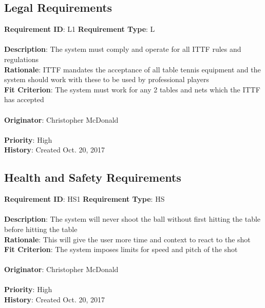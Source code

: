 \documentclass[11pt]{article}
\begin{document}
\subsection{Legal Requirements}
\begin{framed}
	\noindent\textbf{Requirement ID}: L1 \hfill \textbf{Requirement Type}: L \hfill\\\\
	\noindent\textbf{Description}: The system must comply and operate for all ITTF rules and regulations \\
	\textbf{Rationale}: ITTF mandates the acceptance of all table tennis equipment and the system should work with these to be used by professional players \\
	\textbf{Fit Criterion}: The system must work for any 2 tables and nets which the ITTF has accepted \\\\
	\textbf{Originator}: Christopher McDonald \\\\
	\textbf{Priority}: High \hfill \\
	\noindent\textbf{History}: Created Oct. 20, 2017
\end{framed}
\subsection{Health and Safety Requirements}
\begin{framed}
	\noindent\textbf{Requirement ID}: HS1 \hfill \textbf{Requirement Type}: HS \hfill\\\\
	\noindent\textbf{Description}: The system will never shoot the ball without first hitting the table before hitting the table \\
	\textbf{Rationale}: This will give the user more time and context to react to the shot \\
	\textbf{Fit Criterion}: The system imposes limits for speed and pitch of the shot \\\\
	\textbf{Originator}: Christopher McDonald \\\\
	\textbf{Priority}: High \hfill \\
	\noindent\textbf{History}: Created Oct. 20, 2017
\end{framed}
\end{document}
